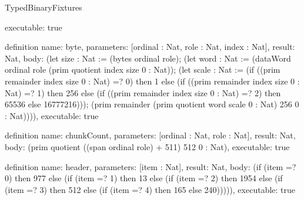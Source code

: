 \begin{lexlean}{TypedBinaryFixtures}
\begin{semanticmodule}
{  executable: true
}

definition{
  name: byte,
  parameters: [ordinal : Nat, role : Nat, index : Nat],
  result: Nat,
  body: (let size : Nat := (bytes ordinal role); (let word : Nat := (dataWord ordinal role (prim quotient index size 0 : Nat)); (let scale : Nat := (if ((prim remainder index size 0 : Nat) =? 0) then 1 else (if ((prim remainder index size 0 : Nat) =? 1) then 256 else (if ((prim remainder index size 0 : Nat) =? 2) then 65536 else 16777216))); (prim remainder (prim quotient word scale 0 : Nat) 256 0 : Nat)))),
  executable: true
}

definition{
  name: chunkCount,
  parameters: [ordinal : Nat, role : Nat],
  result: Nat,
  body: (prim quotient ((span ordinal role) + 511) 512 0 : Nat),
  executable: true
}

definition{
  name: header,
  parameters: [item : Nat],
  result: Nat,
  body: (if (item =? 0) then 977 else (if (item =? 1) then 13 else (if (item =? 2) then 1954 else (if (item =? 3) then 512 else (if (item =? 4) then 165 else 240))))),
  executable: true
}


\end{semanticmodule}
\end{lexlean}
